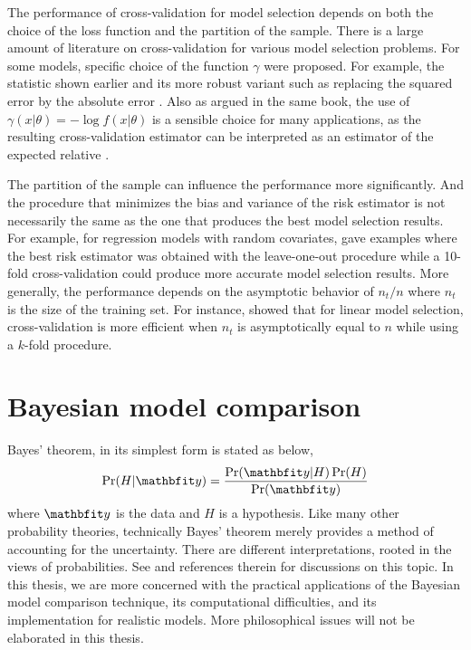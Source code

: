 The performance of cross-validation for model selection depends on both the
choice of the loss function and the partition of the sample. There is a large
amount of literature on cross-validation for various model selection
problems. For some models, specific choice of the function $\gamma$ were
proposed. For example, the \press statistic shown earlier and its more robust
variant such as replacing the squared error by the absolute error
\cite[][sec.~2.9]{Claeskens:2008tq}. Also as argued in the same book, the use
of $\gamma(x|\theta) = -\log f(x|\theta)$ is a sensible choice for many
applications, as the resulting cross-validation estimator can be interpreted
as an estimator of the expected relative \kld.

The partition of the sample can influence the performance more significantly.
And the procedure that minimizes the bias and variance of the risk estimator
is not necessarily the same as the one that produces the best model selection
results. For example, for regression models with random covariates,
\cite{Breiman:1992vx} gave examples where the best risk estimator was
obtained with the leave-one-out procedure while a 10-fold cross-validation
could produce more accurate model selection results. More generally, the
performance depends on the asymptotic behavior of $n_t/n$ where $n_t$ is the
size of the training set. For instance, \cite{Shao:1997vx} showed that for
linear model selection, cross-validation is more efficient when $n_t$ is
asymptotically equal to $n$ while using a $k$-fold procedure.

\section{Bayesian model comparison}
\label{sec:Bayesian model comparison}

Bayes' theorem, in its simplest form is stated as below,
\begin{equation}
  \Pr(H|\data) = \frac{\Pr(\data|H)\Pr(H)}{\Pr(\data)} \label{eq:bayes}
\end{equation}
where $\data$ is the data and $H$ is a hypothesis. Like many other
probability theories, technically Bayes' theorem merely provides a method of
accounting for the uncertainty. There are different interpretations, rooted
in the views of probabilities. See \cite[][chap.~1]{Bernardo:1994vd} and
references therein for discussions on this topic. In this thesis, we are more
concerned with the practical applications of the Bayesian model comparison
technique, its computational difficulties, and its implementation for
realistic models. More philosophical issues will not be elaborated in this
thesis.

